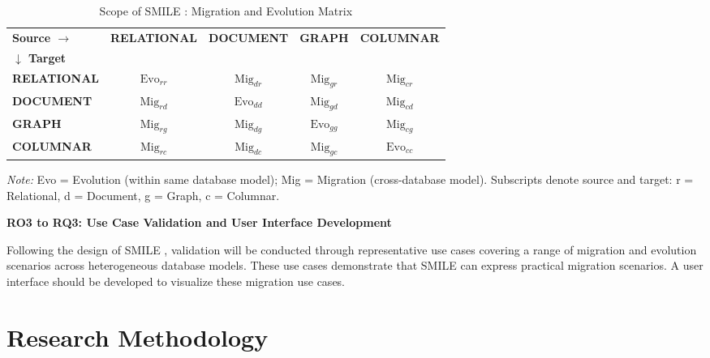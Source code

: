 \begin{table}[htbp]
\centering
\caption{Scope of SMILE : Migration and Evolution Matrix}
\label{tab:migration-matrix}
\begin{tabular}{l c c c c}
\toprule
\textbf{Source $\rightarrow$} & \multirow{2}{*}{\textbf{RELATIONAL}} & \multirow{2}{*}{\textbf{DOCUMENT}} & \multirow{2}{*}{\textbf{GRAPH}} & \multirow{2}{*}{\textbf{COLUMNAR}} \\
\textbf{$\downarrow$ Target} & & & & \\
\midrule
\textbf{RELATIONAL} & \cellcolor{evocolor}$\text{Evo}_{rr}$ & \cellcolor{migcolor}$\text{Mig}_{dr}$ & \cellcolor{migcolor}$\text{Mig}_{gr}$ & \cellcolor{migcolor}$\text{Mig}_{cr}$ \\
\textbf{DOCUMENT}   & \cellcolor{migcolor}$\text{Mig}_{rd}$ & \cellcolor{evocolor}$\text{Evo}_{dd}$ & \cellcolor{migcolor}$\text{Mig}_{gd}$ & \cellcolor{migcolor}$\text{Mig}_{cd}$ \\
\textbf{GRAPH}      & \cellcolor{migcolor}$\text{Mig}_{rg}$ & \cellcolor{migcolor}$\text{Mig}_{dg}$ & \cellcolor{evocolor}$\text{Evo}_{gg}$ & \cellcolor{migcolor}$\text{Mig}_{cg}$ \\
\textbf{COLUMNAR}   & \cellcolor{migcolor}$\text{Mig}_{rc}$ & \cellcolor{migcolor}$\text{Mig}_{dc}$ & \cellcolor{migcolor}$\text{Mig}_{gc}$ & \cellcolor{evocolor}$\text{Evo}_{cc}$ \\
\bottomrule
\end{tabular}

\vspace{0.5em}
\begin{minipage}{\linewidth}
\raggedright
\footnotesize
\textit{Note:} Evo = Evolution (within same database model); Mig = Migration (cross-database model).
Subscripts denote source and target: r = Relational, d = Document, g = Graph, c = Columnar.
\end{minipage}
\end{table}

\textbf{RO3 to RQ3: Use Case Validation and User Interface Development}

Following the design of SMILE , validation will be conducted through representative use cases covering a range of migration and evolution scenarios across heterogeneous database models. These use cases demonstrate that SMILE  can express practical migration scenarios. A user interface should be developed to visualize these migration use cases.


\section{Research Methodology}

